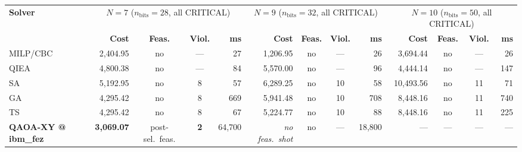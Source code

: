 \begin{landscape}
\begin{minipage}{\linewidth}
\centering
{}
\label{tab:ext_str}
{\scriptsize
\renewcommand{\arraystretch}{1.0}
\setlength{\tabcolsep}{8pt}
\begin{tabular}{l r c c r r c c r r c c r}
\toprule
\multirow{2}{*}{\textbf{Solver}}
& \multicolumn{4}{c}{$N=7$ ($n_{\text{bits}}=28$, all CRITICAL)}
& \multicolumn{4}{c}{$N=9$ ($n_{\text{bits}}=32$, all CRITICAL)}
& \multicolumn{4}{c}{$N=10$ ($n_{\text{bits}}=50$, all CRITICAL)} \\
\cmidrule(lr){2-5} \cmidrule(lr){6-9} \cmidrule(lr){10-13}
& \textbf{Cost} & \textbf{Feas.} & \textbf{Viol.} & \textbf{ms}
& \textbf{Cost} & \textbf{Feas.} & \textbf{Viol.} & \textbf{ms}
& \textbf{Cost} & \textbf{Feas.} & \textbf{Viol.} & \textbf{ms} \\
\midrule
MILP/CBC      &  2{,}404.95 & no & --- & 27   & 1{,}206.95 & no & --- & 26    & 3{,}694.44 & no & --- & 26 \\
QIEA          &  4{,}800.38 & no & --- & 84   & 5{,}570.00 & no & --- & 96    & 4{,}444.14 & no & --- & 147 \\
SA            &  5{,}192.95 & no & 8   & 57   & 6{,}289.25 & no & 10  & 58    & 10{,}493.56 & no & 11  & 71 \\
GA            &  4{,}295.42 & no & 8   & 669  & 5{,}941.48 & no & 10  & 708   & 8{,}448.16 & no & 11  & 740 \\
TS            &  4{,}295.42 & no & 8   & 67   & 5{,}224.77 & no & 10  & 88    & 8{,}448.16 & no & 11  & 225 \\
\textbf{QAOA-XY @ ibm\_fez} & \textbf{3{,}069.07} & post-sel.\ feas. & \textbf{2} & 64{,}700 & \emph{no feas.\ shot} & no & --- & 18{,}800  & --- & --- & --- & --- \\
\bottomrule
\end{tabular}}
\end{minipage}

\end{landscape}